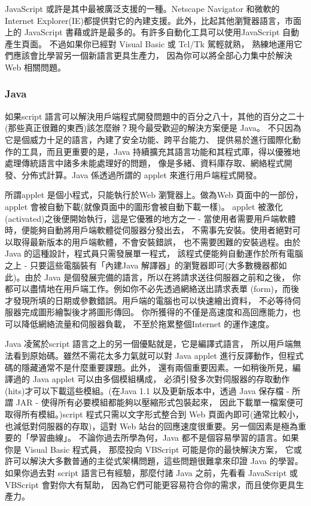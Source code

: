 JavaScript 或許是其中最被廣泛支援的一種。Netscape Navigator 和微軟的
Internet Explorer(IE)都提供對它的內建支援。此外，比起其他瀏覽器語言，市面上的
JavaScript 書藉或許是最多的。有許多自動化工具可以使用JavaScript 自動產生頁面。
不過如果你已經對 Visual Basic 或 Tcl/Tk 駕輕就熟，
熟練地運用它們應該會比學習另一個新語言更具生產力，
因為你可以將全部心力集中於解決 Web 相關問題。

\subsubsection{Java} 
如果script 語言可以解決用戶端程式開發問題中的百分之八十，其他的百分之二十
(那些真正很難的東西)該怎麼辦？現今最受歡迎的解決方案便是 Java。
不只因為它是個威力十足的語言，內建了安全功能、跨平台能力、
提供易於進行國際化動作的工具，而且更重要的是，Java
持續擴充其語言功能和其程式庫，得以優雅地處理傳統語言中諸多未能處理好的問題，
像是多緒、資料庫存取、網絡程式開發、分佈式計算。Java 係透過所謂的
applet 來進行用戶端程式開發。

所謂applet 是個小程式，只能執行於Web 瀏覽器上。做為Web 頁面中的一部份，
applet 會被自動下載(就像頁面中的圖形會被自動下載一樣)。
applet 被激化(activated)之後便開始執行，這是它優雅的地方之一 -
當使用者需要用戶端軟體時，便能夠自動將用戶端軟體從伺服器分發出去，
不需事先安裝。使用者絕對可以取得最新版本的用戶端軟體，不會安裝錯誤，
也不需要困難的安裝過程。由於Java 的這種設計，程式員只需發展單一程式，
該程式便能夠自動運作於所有電腦之上 -
只要這些電腦裝有「內建Java 解譯器」的瀏覽器即可(大多數機器都如此)。由於
Java 是個發展完備的語言，所以在將請求送往伺服器之前和之後，
你都可以盡情地在用戶端工作。例如你不必先透過網絡送出請求表單
(form)，而後才發現所填的日期或參數錯誤。用戶端的電腦也可以快速繪出資料，
不必等待伺服器完成圖形繪製後才將圖形傳回。
你所獲得的不僅是高速度和高回應能力，也可以降低網絡流量和伺服器負載，
不至於拖累整個Internet 的運作速度。

Java 凌駕於script 語言之上的另一個優點就是，它是編譯式語言，
所以用戶端無法看到原始碼。雖然不需花太多力氣就可以對
Java applet 進行反譯動作，但程式碼的隱藏通常不是什麼重要課題。此外，
還有兩個重要因素。一如稍後所見，編譯過的 Java applet 可以由多個模組構成，
必須引發多次對伺服器的存取動作
(hits)才可以下載這些模組。(在Java 1.1 以及更新版本中，透過 Java 保存檔 -
所謂 JAR - 使得所有必要模組都能夠以壓縮形式包裝起來，
因此下載單一檔案便可取得所有模組。)script 程式只需以文字形式整合到
Web 頁面內即可(通常比較小，也減低對伺服器的存取)，這對
Web 站台的回應速度很重要。另一個因素是極為重要的「學習曲線」。
不論你過去所學為何，Java 都不是個容易學習的語言。如果你是 Visual Basic 程式員，
那麼投向 VBScript 可能是你的最快解決方案，
它或許可以解決大多數普通的主從式架構問題，這些問題很難拿來印證
Java 的學習。如果你過去對 script 語言已有經驗，那麼付諸
Java 之前，先看看 JavaScript 或VBScript 會對你大有幫助，
因為它們可能更容易符合你的需求，而且使你更具生產力。
